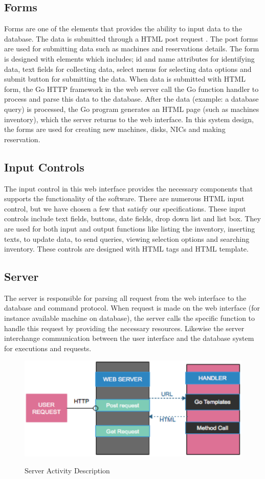 \subsection*{Forms}
 Forms are one  of the elements that provides the ability to input data to the database. The data is submitted through a HTML post request \cite{WinNT}. The post forms are used for submitting data such as machines and reservations details. The form is designed with elements which includes; id and name attributes for identifying data, text fields for collecting data, select menus for selecting data options and submit button for submitting the data. When data is submitted with HTML form, the Go HTTP framework in the web server call the Go function handler to process and parse this data to the database.  After the data (example: a database query) is processed, the Go program generates an HTML page (such as machines inventory), which the server returns to the web interface. In this system design, the forms are used for creating new machines, disks, NICs and making reservation. 
\subsection*{Input Controls}
The input control in this web interface provides the necessary components that supports the functionality of the software. There are numerous HTML input control, but we have chosen a few that satisfy our specifications. These input controls include text fields, buttons, date fields, drop down list and list box. They are used for both input and output functions like listing the inventory, inserting texts, to update data, to send queries, viewing selection options and searching inventory. These controls are designed with HTML tags and HTML template.
\subsection{Server}
The server is responsible for parsing all request from the web interface to the database and command protocol. When request is made on the web interface (for instance available machine on database), the server calls the  specific function to handle this request by providing the necessary resources. Likewise the server interchange communication between the user interface and the database system for executions and requests. 
\begin{figure}[h!]
\includegraphics[width = \linewidth]{server.eps}
\label{fig:Description of Server Activity} 
\caption{Server Activity Description}
\end{figure}
